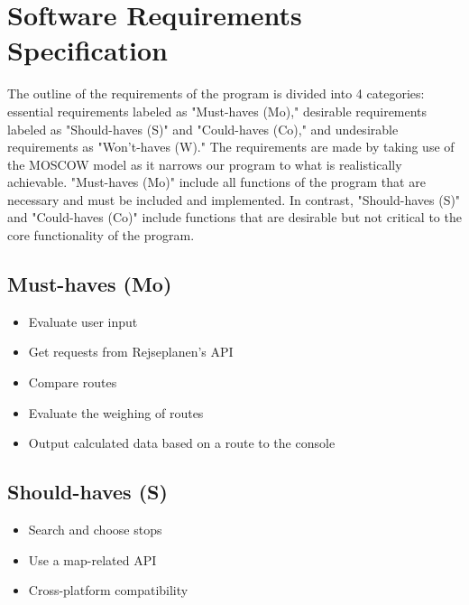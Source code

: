 \section{Software Requirements Specification}\label{sec:software-requirements-specification}

The outline of the requirements of the program is divided into 4 categories: essential requirements labeled as
"Must-haves (Mo)," desirable requirements labeled as "Should-haves (S)" and "Could-haves (Co)," and
undesirable requirements as "Won't-haves (W)."
The requirements are made by taking use of the MOSCOW model as it narrows our program to what is realistically
achievable.
"Must-haves (Mo)" include all functions of the program that are necessary and must be included and implemented. In
contrast, "Should-haves (S)" and "Could-haves (Co)" include functions that are desirable but not critical to the core
functionality of the program.

\subsection{Must-haves (Mo)}\label{subsec:must-haves}

\begin{itemize}
    \item Evaluate user input
    \item Get requests from Rejseplanen’s API
    \item Compare routes
    \item Evaluate the weighing of routes
    \item Output calculated data based on a route to the console
\end{itemize}

\subsection{Should-haves (S)}\label{subsec:should-haves}

\begin{itemize}
    \item Search and choose stops
    \item Use a map-related API
    \item Cross-platform compatibility
\end{itemize}

